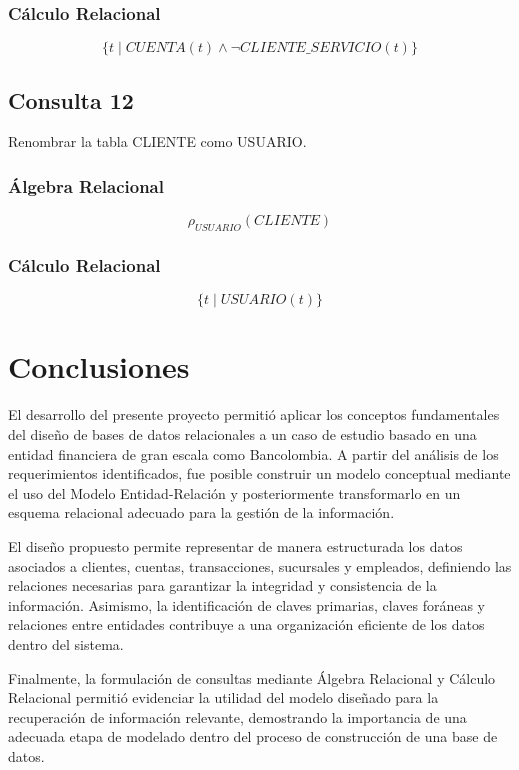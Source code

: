 \documentclass[stu,12pt,floatsintext]{apa7}
\begin{document}
\subsubsection{Cálculo Relacional}

\[
\{t \mid
CUENTA(t)
\land
\neg CLIENTE\_SERVICIO(t)
\}
\]


\subsection{Consulta 12}
Renombrar la tabla CLIENTE como USUARIO.

\subsubsection{Álgebra Relacional}

\[
\rho_{USUARIO}(CLIENTE)
\]

\subsubsection{Cálculo Relacional}

\[
\{t \mid USUARIO(t)\}
\]


\section{Conclusiones}

El desarrollo del presente proyecto permitió aplicar los conceptos fundamentales del diseño de bases de datos relacionales a un caso de estudio basado en una entidad financiera de gran escala como Bancolombia. A partir del análisis de los requerimientos identificados, fue posible construir un modelo conceptual mediante el uso del Modelo Entidad-Relación y posteriormente transformarlo en un esquema relacional adecuado para la gestión de la información.

El diseño propuesto permite representar de manera estructurada los datos asociados a clientes, cuentas, transacciones, sucursales y empleados, definiendo las relaciones necesarias para garantizar la integridad y consistencia de la información. Asimismo, la identificación de claves primarias, claves foráneas y relaciones entre entidades contribuye a una organización eficiente de los datos dentro del sistema.

Finalmente, la formulación de consultas mediante Álgebra Relacional y Cálculo Relacional permitió evidenciar la utilidad del modelo diseñado para la recuperación de información relevante, demostrando la importancia de una adecuada etapa de modelado dentro del proceso de construcción de una base de datos.


\printbibliography
\end{document}
